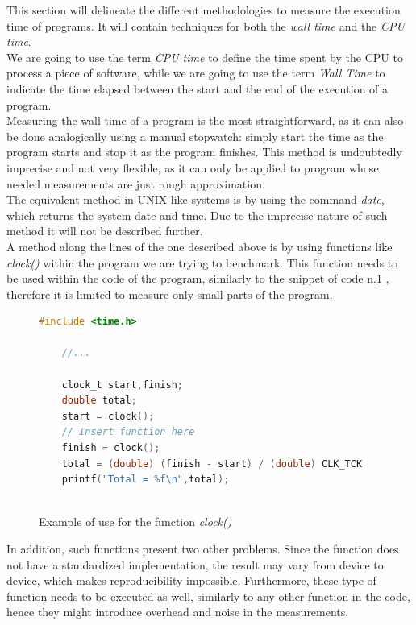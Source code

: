 This section will delineate the different methodologies to measure the execution time of programs. It will contain techniques for both the \textit{wall time} and the \textit{CPU time}. \\
We are going to use the term  \textit{CPU time} to define the time spent by the CPU to process a piece of software, while we are going to use the term \textit{Wall Time} to indicate the time elapsed between the start and the end of the execution of a program.\\\hfill
Measuring the wall time of a program is the most straightforward, as it can also be done analogically using a manual stopwatch: simply start the time as the program starts and stop it as the program finishes. This method is undoubtedly imprecise and not very flexible, as it can only be applied to program whose needed measurements are just rough approximation.\cite{Stewart2001MeasuringET}\\
The equivalent method in UNIX-like systems is by using the command \textit{date}, which returns the system date and time. Due to the imprecise nature of such method it will not be described further. \\
A method along the lines of the one described above is by using functions like \textit{clock()} within the program we are trying to benchmark. This function needs to be used within the code of the program, similarly to the snippet of code n.\ref{fig:code} \cite{Stewart2001MeasuringET}, therefore it is limited to measure only small parts of the program. \\
\begin{figure}
\begin{lstlisting}[language=C, label= code]
    #include <time.h>
    
    //...
    
    clock_t start,finish;
    double total;
    start = clock();
    // Insert function here
    finish = clock();
    total = (double) (finish - start) / (double) CLK_TCK
    printf("Total = %f\n",total);
    
\end{lstlisting}
\caption{Example of use for the function \textit{clock()}}
\label{fig:code}
\end{figure}
In addition, such functions present two other problems. Since the function does not have a standardized implementation, the result may vary from device to device, which makes reproducibility impossible. 
Furthermore, these type of function needs to be executed as well, similarly to any other function in the code, hence they might introduce overhead and noise in the measurements. \\

